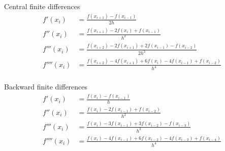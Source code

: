 \documentclass[pdflatex,compress,mathserif]{beamer}
\begin{document}
\begin{frame}{Central finite differences}
    \begin{align*}
        f'(x_i) &= \frac{f(x_{i+1}) - f(x_{i-1})}{2h}\\
        f''(x_i) &= \frac{f(x_{i+1}) - 2f(x_{i}) + f(x_{i-1})}{h^2}\\
        f'''(x_i) &= \frac{f(x_{i+2}) - 2f(x_{i+1}) + 2f(x_{i-1}) - f(x_{i-2})}{2h^3}\\
        f''''(x_i) &= \frac{f(x_{i+2}) - 4f(x_{i+1}) + 6f(x_{i}) - 4f(x_{i-1}) + f(x_{i-2})}{h^4}\\
    \end{align*}
\end{frame}

\begin{frame}{Backward finite differences}
    \begin{align*}
        f'(x_i) &= \frac{f(x_{i}) - f(x_{i-1})}{h}\\
        f''(x_i) &= \frac{f(x_i) - 2f(x_{i-1}) + f(x_{i-2})}{h^2}\\
        f'''(x_i) &= \frac{f(x_i) - 3f(x_{i-1}) + 3f(x_{i-2}) - f(x_{i-3})}{h^3}\\
        f''''(x_i) &= \frac{f(x_i) - 4f(x_{i-1}) + 6f(x_{i-2}) - 4f(x_{i-3}) + f(x_{i-4})}{h^4}\\
    \end{align*}
\end{frame}
\end{document}
